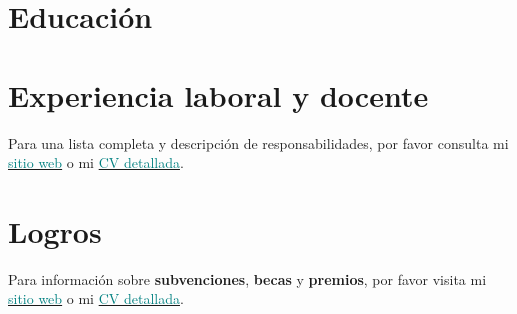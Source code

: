 \documentclass[11pt, a4paper]{awesome-cv}
\begin{document}
\hypertarget{educaciuxf3n}{%
\section{Educación}\label{educaciuxf3n}}

\begin{cventries}
    \vspace{-4.0mm}
    \vspace{-4.0mm}
    \vspace{-4.0mm}
\end{cventries}

\hypertarget{experiencia-laboral-y-docente}{%
\section{Experiencia laboral y
docente}\label{experiencia-laboral-y-docente}}

Para una lista completa y descripción de responsabilidades, por favor
consulta mi
\href{https://jdleongomez.info/es/\#experience}{\textcolor{teal}{sitio web}}
o mi
\href{https://jdleongomez.info/es/files/jdl_cv_es.pdf}{\textcolor{teal}{CV detallada}}.

\begin{cventries}
    \vspace{-4.0mm}
    \vspace{-4.0mm}
    \vspace{-4.0mm}
\end{cventries}

\hypertarget{logros}{%
\section{Logros}\label{logros}}

Para información sobre \textbf{subvenciones}, \textbf{becas} y
\textbf{premios}, por favor visita mi
\href{https://jdleongomez.info/es/\#accomplishments}{\textcolor{teal}{sitio web}}
o mi
\href{https://jdleongomez.info/es/files/jdl_cv_es.pdf}{\textcolor{teal}{CV detallada}}.
\end{document}
